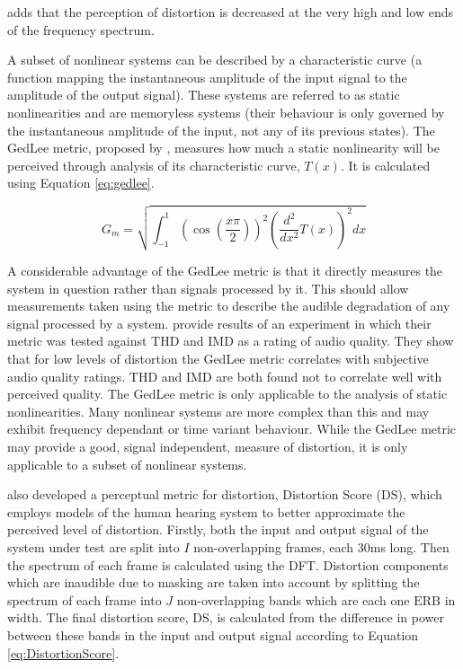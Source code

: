 			\citet{voishvillo2006assessment} adds that the perception of distortion is decreased at the very
			high and low ends of the frequency spectrum.

			A subset of nonlinear systems can be described by a characteristic curve (a function mapping the
			instantaneous amplitude of the input signal to the amplitude of the output signal). These systems
			are referred to as static nonlinearities and are memoryless systems (their behaviour is only
			governed by the instantaneous amplitude of the input, not any of its previous states). The GedLee
			metric, proposed by \citet{geddes2003auditory}, measures how much a static nonlinearity will be
			perceived through analysis of its characteristic curve, $T(x)$. It is calculated using Equation
			\ref{eq:gedlee}.

			\begin{equation}
				G_{m} = \sqrt{\int_{-1}^{1} \left( \cos \left( \frac{x\pi}{2} \right) \right)^{2}
					      \left( \frac{d^{2}}{dx^{2}} T(x) \right)^{2} dx}
				\label{eq:gedlee}
			\end{equation}

			A considerable advantage of the GedLee metric is that it directly measures the system in question
			rather than signals processed by it. This should allow measurements taken using the metric to
			describe the audible degradation of any signal processed by a system. \citet{lee2003auditory}
			provide results of an experiment in which their metric was tested against THD and IMD as a rating of
			audio quality. They show that for low levels of distortion the GedLee metric correlates with
			subjective audio quality ratings. THD and IMD are both found not to correlate well with perceived
			quality. The GedLee metric is only applicable to the analysis of static nonlinearities. Many
			nonlinear systems are more complex than this and may exhibit frequency dependant or time variant
			behaviour. While the GedLee metric may provide a good, signal independent, measure of distortion, it
			is only applicable to a subset of nonlinear systems.

			\citet{tan2003the} also developed a perceptual metric for distortion, Distortion Score
			($\mathrm{DS}$), which employs models of the human hearing system to better approximate the
			perceived level of distortion. Firstly, both the input and output signal of the system under test
			are split into $I$ non-overlapping frames, each 30ms long. Then the spectrum of each frame is
			calculated using the DFT. Distortion components which are inaudible due to masking are taken into
			account by splitting the spectrum of each frame into $J$ non-overlapping bands which are each one
			$\mathrm{ERB}$ in width. The final distortion score, $\mathrm{DS}$, is calculated from the
			difference in power between these bands in the input and output signal according to Equation
			\ref{eq:DistortionScore}.

